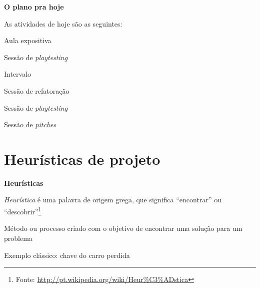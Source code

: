 \expandafter\documentclass\expandafter[table, usenames, svgnames, dvipsnames, \classopts]{beamer}
\begin{document}
\begin{frame}{\textbf{O plano pra hoje}}

	As atividades de hoje são as seguintes:

	\begin{outline}[enumerate]
		\1 Aula expositiva
			
		\vspace{1em}

		\1 Sessão de \textit{playtesting}

		\vspace{1em}

		\1 Intervalo

		\vspace{1em}

		\1 Sessão de refatoração

		\vspace{1em}

		\1 Sessão de \textit{playtesting}

		\vspace{1em}

		\1 Sessão de \textit{pitches}

	\end{outline}

\end{frame}

\section{Heurísticas de projeto}

\begin{frame}{\textbf{Heurísticas}}

	\begin{outline}

		\1 \textit{Heurística} é uma palavra de origem grega, que significa ``encontrar'' ou ``descobrir''\footnote{Fonte: \url{http://pt.wikipedia.org/wiki/Heur\%C3\%ADstica}}

		\vspace{1em}

		\1 Método ou processo criado com o objetivo de encontrar uma solução para um problema

		\vspace{1em}

		\1 Exemplo clássico: chave do carro perdida

	\end{outline}

\end{frame}
\end{document}
